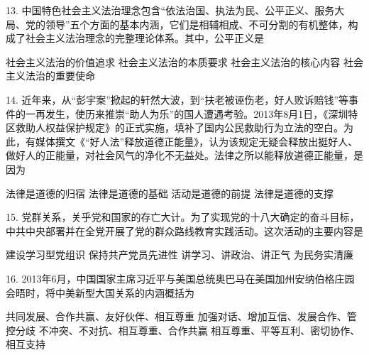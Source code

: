 13. 中国特色社会主义法治理念包含“依法治国、执法为民、公平正义、服务大局、党的领导”五个方面的基本内涵，它们是相辅相成、不可分割的有机整体，构成了社会主义法治理念的完整理论体系。其中，公平正义是
\begin{choices}
	 社会主义法治的价值追求
	 社会主义法治的本质要求
	 社会主义法治的核心内容
	 社会主义法治的重要使命
\end{choices}

14. 近年来，从“彭宇案”掀起的轩然大波，到“扶老被诬伤老，好人败诉赔钱”等事件的一再发生，使历来推崇“助人为乐”的国人遭遇考验。2013年8月1日，《深圳特区救助人权益保护规定》的正式实施，填补了国内公民救助行为立法的空白。为此，有媒体撰文《“好人法”释放道德正能量》，认为该规定无疑会释放出挺好人、做好人的正能量，对社会风气的净化不无益处。法律之所以能释放道德正能量，是因为
\begin{choices}
	 法律是道德的归宿
	 法律是道德的基础
	 活动是道德的前提
	 法律是道德的支撑
\end{choices}

15. 党群关系，关乎党和国家的存亡大计。为了实现党的十八大确定的奋斗目标，中共中央部署并在全党开展了党的群众路线教育实践活动。这次活动的主要内容是
\begin{choices}
	 建设学习型党组识
	 保持共产党员先进性
	 讲学习、讲政治、讲正气
	 为民务实清廉
\end{choices}

16. 2013年6月，中国国家主席习近平与美国总统奥巴马在美国加州安纳伯格庄园会晤时，将中美新型大国关系的内涵概括为
\begin{choices}
	 共同发展、合作共赢、友好伙伴、相互尊重
	 加强对话、增加互信、发展合作、管控分歧
	 不冲突、不对抗、相互尊重、合作共赢
	 相互尊重、平等互利、密切协作、相互支持
\end{choices}